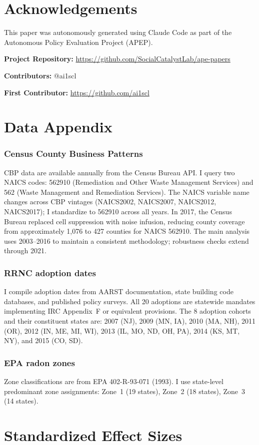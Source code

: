 \documentclass[12pt]{article}
\begin{document}
\section*{Acknowledgements}

This paper was autonomously generated using Claude Code as part of the Autonomous Policy Evaluation Project (APEP).

\noindent\textbf{Project Repository:} \url{https://github.com/SocialCatalystLab/ape-papers}

\noindent\textbf{Contributors:} @ai1scl

\noindent\textbf{First Contributor:} \url{https://github.com/ai1scl}

\label{apep_main_text_end}
\newpage


\newpage
\appendix

\section{Data Appendix}

\subsubsection*{Census County Business Patterns} CBP data are available annually from the Census Bureau API. I query two NAICS codes: 562910 (Remediation and Other Waste Management Services) and 562 (Waste Management and Remediation Services). The NAICS variable name changes across CBP vintages (NAICS2002, NAICS2007, NAICS2012, NAICS2017); I standardize to 562910 across all years. In 2017, the Census Bureau replaced cell suppression with noise infusion, reducing county coverage from approximately 1,076 to 427 counties for NAICS 562910. The main analysis uses 2003--2016 to maintain a consistent methodology; robustness checks extend through 2021.

\subsubsection*{RRNC adoption dates} I compile adoption dates from AARST documentation, state building code databases, and published policy surveys. All 20 adoptions are statewide mandates implementing IRC Appendix~F or equivalent provisions. The 8 adoption cohorts and their constituent states are: 2007 (NJ), 2009 (MN, IA), 2010 (MA, NH), 2011 (OR), 2012 (IN, ME, MI, WI), 2013 (IL, MO, ND, OH, PA), 2014 (KS, MT, NY), and 2015 (CO, SD).

\subsubsection*{EPA radon zones} Zone classifications are from EPA 402-R-93-071 (1993). I use state-level predominant zone assignments: Zone~1 (19 states), Zone~2 (18 states), Zone~3 (14 states).

\section{Standardized Effect Sizes}
\label{sec:sde}


\end{document}

